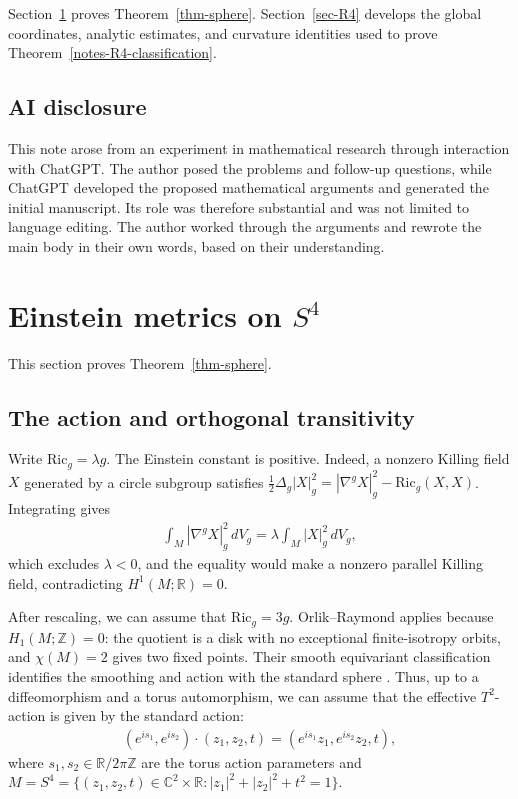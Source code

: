 \documentclass[letterpaper]{amsart}
\theoremstyle{definition}
\theoremstyle{remark}
\begin{document}
Section~\ref{sec-sphere} proves Theorem~\ref{thm-sphere}.
Section~\ref{sec-R4} develops the global coordinates, analytic estimates,
and curvature identities used to prove Theorem~\ref{notes-R4-classification}.

\subsection*{AI disclosure}
This note arose from an experiment in mathematical research through
interaction with ChatGPT. The author posed the problems and follow-up
questions, while ChatGPT developed the proposed mathematical arguments
and generated the initial manuscript. Its role was therefore substantial
and was not limited to language editing.
The author worked through the arguments and rewrote the main body in their own words, based on their understanding.

\section{\texorpdfstring{Einstein metrics on $S^4$}{Einstein metrics on S4}}\label{sec-sphere}
This section proves Theorem~\ref{thm-sphere}.

\subsection{The action and orthogonal transitivity}\label{subsec-orthogonal}
Write $\mathrm{Ric}_g=\lambda g$. The Einstein constant is positive.
Indeed, a nonzero Killing field $X$ generated by a circle subgroup satisfies $\frac12\Delta_g|X|_g^2=|\nabla^gX|_g^2-\mathrm{Ric}_g(X,X)$. Integrating gives
\begin{align*}
	\int_{M}|\nabla^g X|_g^2\,dV_g = \lambda \int_{M} |X|_g^2\,dV_g ,
\end{align*} 
which excludes $\lambda <0$, and the equality would make a nonzero parallel Killing field, contradicting $H^1(M; \mathbb{R}) =0$.

After rescaling, we can assume that $\mathrm{Ric}_g = 3 g$. Orlik--Raymond applies because $H_1(M;\mathbb Z)=0$: the quotient is a disk with no exceptional finite-isotropy orbits, and $\chi(M)=2$ gives two fixed points. Their smooth equivariant classification identifies the smoothing and action with the standard sphere \cite[\S\S4.2, 5.1--5.4]{notes-OrlikRaymond}. Thus, up to a diffeomorphism and a torus automorphism, we can assume that the effective $T^2$-action is given by the standard action:
\begin{align*}
	\left( e ^{i s_1}, e ^{i s_2} \right) \cdot  \left( z_1, z_2, t \right) = \left( e ^{i s_1} z_1, e ^{i s_2}z_2, t \right) ,
\end{align*} 
where $s_1,s_2\in\mathbb R/2\pi\mathbb Z$ are the torus action parameters and $M=S^4 = \{ (z_1, z_2, t) \in \mathbb{C}^2 \times \mathbb{R}: |z_1|^2+ |z_2|^2+ t ^2 =1\} $.
\end{document}

